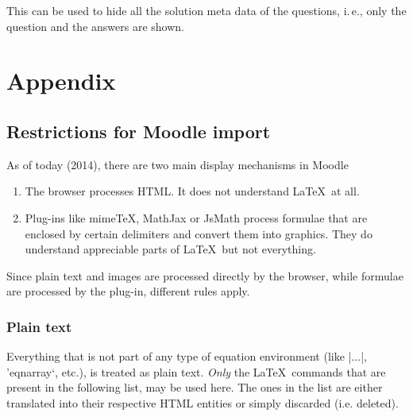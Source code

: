 \documentclass[a4paper,10pt]{ltxdoc}
\begin{document}
\DescribeMacro{\hidesolution} This can be used to hide all the solution meta
data of the questions, i.\,e., only the question and the answers are shown.







\section{Appendix}

\subsection{Restrictions for Moodle import}\label{secrestr}
As of today (2014), there are two main display mechanisms in Moodle
\begin{enumerate}
  \item The browser processes HTML. It does not understand \LaTeX\ at all.
  \item Plug-ins like mimeTeX, MathJax or JsMath process
    formulae that are enclosed by
  certain delimiters and convert them into graphics. They do understand
  appreciable parts of \LaTeX\, but not everything.
\end{enumerate}

Since plain text and images are processed directly by the browser, while
formulae are processed by the plug-in, different rules apply.

\subsubsection{Plain text}
Everything that is not part of any type of equation environment (like
|$\ldots$|, 'eqnarray`, etc.), is treated as plain text.
\emph{Only} the \LaTeX\ commands that are present in the following list, may
be used here. The ones in the list are either translated into their respective
HTML entities or simply discarded (i.e. deleted).
\end{document}
